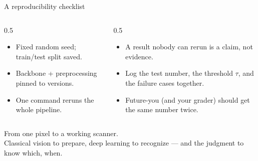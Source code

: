 \documentclass[10pt,aspectratio=169]{beamer}
\begin{document}
\begin{frame}{A reproducibility checklist}
  \begin{columns}[T]
    \begin{column}{0.5\textwidth}
      \begin{goodbox}
        \begin{itemize}
          \item Fixed random seed; train/test split saved.
          \item Backbone + preprocessing pinned to versions.
          \item One command reruns the whole pipeline.
        \end{itemize}
      \end{goodbox}
    \end{column}
    \begin{column}{0.5\textwidth}
      \begin{itemize}
        \item A result nobody can rerun is a claim, not evidence.
        \item Log the test number, the threshold $\tau$, and the failure cases together.
        \item Future-you (and your grader) should get the same number twice.
      \end{itemize}
    \end{column}
  \end{columns}
\end{frame}

\begin{frame}[standout]
  From one pixel to a working scanner.\\[4pt]
  \normalsize Classical vision to prepare, deep learning to recognize — and the judgment to know which, when.
\end{frame}
\end{document}
